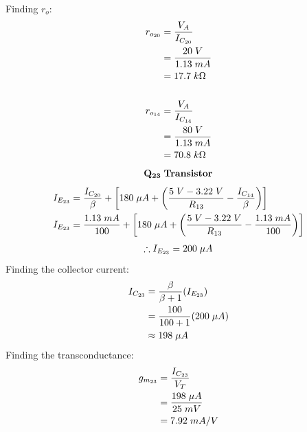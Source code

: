 \documentclass{article}
\begin{document}
	Finding $r_o$:
	\begin{align*}
		r_{o_{20}} &= \frac{V_A}{I_{C_{20}}}\\
		&= \frac{20 \hspace{1mm} V}{1.13 \hspace{1mm} mA}\\
		&= 17.7 \hspace{1mm} k\Omega\\\\
		r_{o_{14}} &= \frac{V_A}{I_{C_{14}}}\\ 
		&= \frac{80 \hspace{1mm} V}{1.13 \hspace{1mm} mA}\\
		&= 70.8 \hspace{1mm} k\Omega
	\end{align*}	
	\pagebreak
	\begin{align*}
		\mathbf{Q_{23}} \hspace{1mm} \textbf{Transistor}
	\end{align*}
	\begin{align*}
		I_{E_{23}} &= \frac{I_{C_{20}}}{\beta} + \left[180 \hspace{1mm} \mu A + \left(\frac{5 \hspace{1mm} V - 3.22 \hspace{1mm} V}{R_{13}} - \frac{I_{C_{14}}}{\beta}\right) \right]\\
		I_{E_{23}} &= \frac{1.13 \hspace{1mm} mA}{100} + \left[180 \hspace{1mm} \mu A + \left(\frac{5 \hspace{1mm} V - 3.22 \hspace{1mm} V}{R_{13}} - \frac{1.13 \hspace{1mm} mA}{100}\right) \right]
	\end{align*}
	\begin{align*}
		\therefore I_{E_{23}} = 200 \hspace{1mm} \mu A
	\end{align*}
	Finding the collector current:
	\begin{align*}
		I_{C_{23}} &= \frac{\beta}{\beta + 1} (I_{E_{23}})\\ 
		&= \frac{100}{100 + 1}(200 \hspace{1mm} \mu A)\\
		&\approx 198 \hspace{1mm} \mu A
	\end{align*}
	Finding the transconductance:
	\begin{align*}
		g_{m_{23}} &= \frac{I_{C_{23}}}{V_T}\\
		&= \frac{198 \hspace{1mm} \mu A}{25 \hspace{1mm} mV}\\
		&= 7.92 \hspace{1mm} mA/V
	\end{align*}
\end{document}
